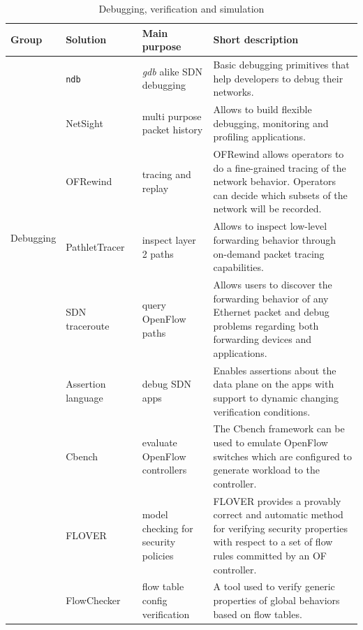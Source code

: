 {\renewcommand{\arraystretch}{1.4}
\begin{table}[!htp]
\caption{Debugging, verification and simulation}
\label{tab:debuggingverification}
\begin{center}
\footnotesize
\begin{tabularx}{\linewidth}{p{1.2cm}p{2.5cm}p{3.5cm}X}
\hline
\textbf{Group} & \textbf{Solution} & \textbf{Main purpose} & \textbf{Short description} \\
\hline
\multirow{6}{*}{Debugging} 
& \texttt{ndb}~\cite{handigol2012-1} & \textit{gdb} alike SDN debugging  & Basic debugging primitives that help developers to debug their networks. \\
& NetSight~\cite{handigol2014} & multi purpose packet history & Allows to build flexible debugging, monitoring and profiling applications. \\ 
& OFRewind~\cite{wundsam2011} & tracing and replay & OFRewind allows operators to do a fine-grained tracing of the network behavior. Operators can decide which subsets of the network will be recorded. \\

& PathletTracer~\cite{Zhang2014_4} & inspect layer 2 paths & Allows to inspect low-level forwarding behavior through on-demand packet tracing capabilities.\\

& SDN traceroute~\cite{Agarwal2014_4} & query OpenFlow paths & Allows users to discover the forwarding behavior of any Ethernet packet and debug problems regarding both forwarding devices and applications.\\

\hline
\multirow{26}{*}{Verification} 
& Assertion language~\cite{Beckett2014_4} & debug SDN apps & Enables assertions about the data plane on the apps with support to dynamic changing verification conditions.\\

& Cbench~\cite{sherwood2011} & evaluate OpenFlow controllers & The Cbench framework can be used to emulate OpenFlow switches which are configured to generate workload to the controller.\\

& FLOVER~\cite{son2013} & model checking for security policies & FLOVER provides a provably correct and automatic method for verifying security properties with respect to a set of flow rules committed by an OF controller.\\
& FlowChecker~\cite{al-shaer2010} & flow table config verification & A tool used to verify generic properties of global behaviors based on flow tables.  \\


\end{tabularx}
\end{center}
\end{table}}
